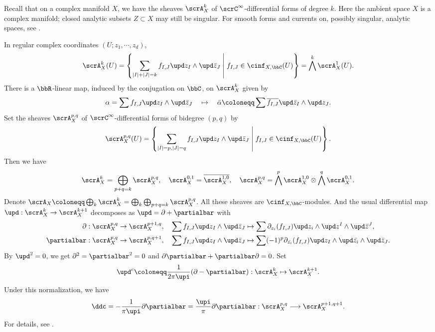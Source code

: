 Recall that on a complex manifold $X$, we have the sheaves $\scrA_X^k$ of $\scrC^\infty$-differential forms of degree $k$.
  Here the ambient space $X$ is a complex manifold; closed analytic subsets $Z \subset X$ may still be singular.
  For smooth forms and currents on, possibly singular, analytic spaces, see \cite[Section 3.2]{Barlet-Magnusson-2019-ComplexAnalyticCycles}.

In regular complex coordinates $(U;z_1,\cdots,z_d)$,
\[ \scrA^k_X(U) = \left\{ \sum_{|I|+|J| = k} f_{I,J} \upd z_I \wedge \upd \bar{z}_J \;\middle|\; f_{I,J} \in \cinf_{X,\bbC}(U) \right\} = \bigwedge^k \scrA^1_X(U). \]
There is a $\bbR$-linear map, induced by the conjugation on $\bbC$, on $\scrA_X^k$ given by
\[ \alpha = \sum f_{I,J} \upd z_I \wedge \upd \bar{z}_J \quad \mapsto \quad \bar{\alpha} \coloneqq \sum \overline{f_{I,J}} \upd \bar{z}_I \wedge \upd z_J. \]
Set the sheaves $\scrA_X^{p,q}$ of $\scrC^\infty$-differential forms of bidegree $(p,q)$ by
\[ \scrA_X^{p,q}(U) = \left\{ \sum_{|I| = p, |J| = q} f_{I,J} \upd z_I \wedge \upd \bar{z}_J \;\middle|\; f_{I,J} \in \cinf_{X,\bbC}(U) \right\}. \]
Then we have
\[ \scrA_X^k = \bigoplus_{p+q = k} \scrA_X^{p,q}, \quad \scrA_X^{0,1} = \overline{\scrA_{X}^{1,0}}, \quad \scrA_X^{p,q} = \bigwedge^p \scrA_X^{1,0} \otimes \bigwedge^q \scrA_X^{0,1}. \]
Denote $\scrA_X \coloneqq \bigoplus_{k} \scrA_X^k = \bigoplus_{k} \bigoplus_{p+q = k} \scrA_X^{p,q}$.
All these sheaves are $\cinf_{X,\bbC}$-modules.
And the usual differential map $\upd: \scrA^k_X \to \scrA_X^{k+1}$ decomposes as $\upd = \partial + \partialbar$ with
\begin{align*}
	\partial    & : \scrA^{p,q}_X \to \scrA^{p+1,q}_X, \quad \sum f_{I,J} \upd z_I \wedge \upd \bar{z}_J \mapsto \sum \partial_{z_i}(f_{I,J})  \upd z_i \wedge \upd z^I \wedge \upd \bar{z}^J,            \\
	\partialbar & : \scrA^{p,q}_X \to \scrA^{p,q+1}_X, \quad \sum f_{I,J} \upd z_I \wedge \upd \bar{z}_J \mapsto \sum (-1)^p\partial_{\bar{z_i}}(f_{I,J}) \upd z_I \wedge \upd \bar{z_i} \wedge \upd \bar{z}_J.
\end{align*}
By $\upd^2 = 0$, we get $\partial^2 = \partialbar^2 = 0$ and $\partial\partialbar+\partialbar\partial = 0$.
Set
\[
	\upd^c \coloneqq \frac{1}{2\pi \upi}(\partial-\partialbar): \scrA_X^{k} \mapsto \scrA_X^{k+1}.
\]
Under this normalization, we have
\[
	\ddc = -\frac{1}{\pi\upi}\partial\partialbar = \frac{\upi}{\pi}\partial\partialbar: \scrA_X^{p,q} \longrightarrow \scrA_X^{p+1,q+1}.
\]
For details, see \cite{Demailly-2012-ComplexAnalyticDifferential}.

